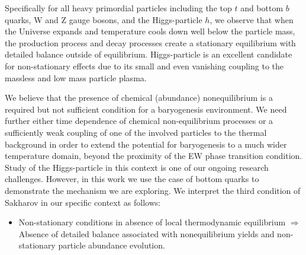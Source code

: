 Specifically for all heavy primordial particles including the top $t$ and bottom $b$ quarks, W and Z gauge bosons, and the Higgs-particle $h$, we observe that when the Universe expands and temperature cools down well below the particle mass, the production process and decay processes create a stationary equilibrium with detailed balance outside of equilibrium. Higgs-particle is an excellent candidate for non-stationary effects due to its small and even vanishing coupling to the massless and low mass particle plasma. 

We believe that the presence of chemical (abundance) nonequilibrium
{\color{blue}is a required but not sufficient condition for a baryogenesis environment. We need further either time dependence of chemical non-equilibrium processes or a sufficiently weak coupling of one of the involved particles to the thermal background in order to extend the potential for baryogenesis to a much wider temperature domain, beyond the proximity of the EW phase transition condition. Study of the Higgs-particle in this context is one of our ongoing research challenges. However, in this work
}
we use the case of bottom quarks to demonstrate the mechanism we are exploring. We interpret the third condition of Sakharov in our specific context as follows:
\begin{itemize}
\item Non-stationary conditions in absence of local thermodynamic equilibrium $\Longrightarrow$ Absence of detailed balance associated with nonequilibrium yields and non-stationary particle abundance evolution.
\end{itemize} 

